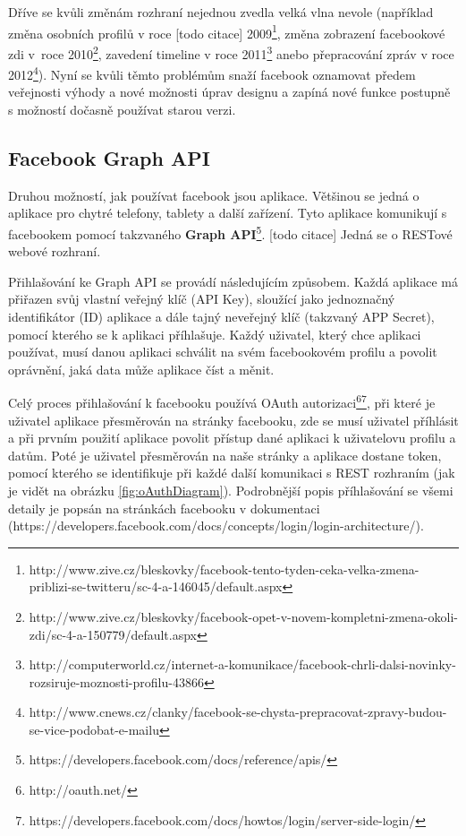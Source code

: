 \documentclass[thesis=M,czech]{FITthesis}[2013/05/10]
\begin{document}
Dříve se kvůli změnám rozhraní nejednou zvedla velká vlna nevole (například změna osobních profilů v roce [todo citace] 2009\footnote{http://www.zive.cz/bleskovky/facebook-tento-tyden-ceka-velka-zmena-priblizi-se-twitteru/sc-4-a-146045/default.aspx}, změna zobrazení facebookové zdi v~roce  2010\footnote{http://www.zive.cz/bleskovky/facebook-opet-v-novem-kompletni-zmena-okoli-zdi/sc-4-a-150779/default.aspx}, zavedení timeline v roce 2011\footnote{http://computerworld.cz/internet-a-komunikace/facebook-chrli-dalsi-novinky-rozsiruje-moznosti-profilu-43866} anebo přepracování zpráv v roce 2012\footnote{http://www.cnews.cz/clanky/facebook-se-chysta-prepracovat-zpravy-budou-se-vice-podobat-e-mailu}). Nyní se kvůli těmto problémům snaží facebook oznamovat předem veřejnosti výhody a nové možnosti úprav designu a zapíná nové funkce postupně s možností dočasně používat starou verzi.  

\subsection{Facebook Graph API}
Druhou možností, jak používat facebook jsou aplikace. Většinou se jedná o aplikace pro chytré telefony, tablety a další zařízení. Tyto aplikace komunikují s facebookem pomocí takzvaného \textbf{Graph API}\footnote{https://developers.facebook.com/docs/reference/apis/}. [todo citace] Jedná se o RESTové webové rozhraní.

Přihlašování ke Graph API se provádí následujícím způsobem. Každá aplikace má přiřazen svůj vlastní veřejný klíč (API Key), sloužící jako jednoznačný identifikátor (ID) aplikace a dále tajný neveřejný klíč (takzvaný APP Secret), pomocí kterého se k aplikaci příhlašuje. Každý uživatel, který chce aplikaci používat, musí danou aplikaci schválit na svém facebookovém profilu a povolit oprávnění, jaká data může aplikace číst a měnit.

Celý proces přihlašování k facebooku používá OAuth autorizaci\footnote{http://oauth.net/}\footnote{https://developers.facebook.com/docs/howtos/login/server-side-login/}, při které je uživatel aplikace přesměrován na stránky facebooku, zde se musí uživatel příhlásit a při prvním použití aplikace povolit přístup dané aplikaci k uživatelovu profilu a datům. Poté je uživatel přesměrován na naše stránky a aplikace dostane token, pomocí kterého se identifikuje při každé další komunikaci s REST rozhraním  (jak je vidět na obrázku \ref{fig:oAuthDiagram}). Podrobnější popis příhlašování se všemi detaily je popsán na stránkách facebooku v dokumentaci \newline(https://developers.facebook.com/docs/concepts/login/login-architecture/). 
\end{document}
